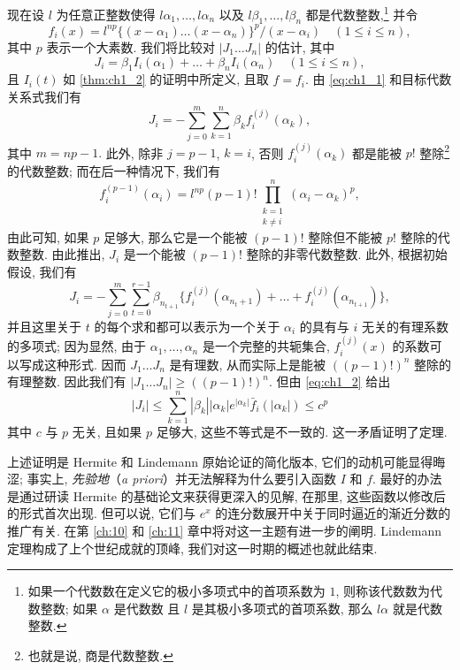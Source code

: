 现在设 $l$ 为任意正整数使得 $l\alpha_1, \dots, l\alpha_n$ 以及 $l\beta_1, \dots, l\beta_n$ 都是代数整数,\footnote{如果一个代数数在定义它的极小多项式中的首项系数为 $1$, 则称该代数数为代数整数; 如果 $\alpha$ 是代数数 且 $l$ 是其极小多项式的首项系数, 那么 $l\alpha$ 就是代数整数.} 并令
\[
f_i(x) = l^{np} \{(x-\alpha_1)\dots(x-\alpha_n)\}^p/(x-\alpha_i) \quad (1 \le i \le n),
\]
其中 $p$ 表示一个大素数. 我们将比较对 $|J_1 \dots J_n|$ 的估计, 其中
\[
J_{i} = \beta_{1} I_{i}(\alpha_{1}) + \dots + \beta_{n} I_{i}(\alpha_{n}) \quad (1 \le i \le n),
\]
且 $I_i(t)$ 如 \autoref{thm:ch1_2} 的证明中所定义, 且取 $f = f_i$. 由 \eqref{eq:ch1_1} 和目标代数关系式我们有
\[
J_i = -\sum_{j=0}^m \sum_{k=1}^n \beta_k f_i^{(j)}(\alpha_k),
\]
其中 $m = np - 1. $ 此外, 除非 $j = p - 1$, $k = i$, 否则 $f_i^{(j)}(\alpha_k)$ 都是能被 $p!$ 整除\footnote{也就是说, 商是代数整数.}的代数整数; 而在后一种情况下, 我们有
\[
f_i^{(p-1)}(\alpha_i) = l^{np}(p-1)! \prod_{\substack{k=1 \\ k \neq i}}^n (\alpha_i - \alpha_k)^p,
\]
由此可知, 如果 $p$ 足够大, 那么它是一个能被 $(p-1)!$ 整除但不能被 $p!$ 整除的代数整数. 由此推出, $J_i$ 是一个能被 $(p-1)!$ 整除的非零代数整数. 此外, 根据初始假设, 我们有
\[
J_{i} = -\sum_{j=0}^{m} \sum_{t=0}^{r-1} \beta_{n_{t+1}} \{ f_{i}^{(j)}(\alpha_{n_t+1}) + \dots + f_{i}^{(j)}(\alpha_{n_{t+1}}) \},
\]
并且这里关于 $t$ 的每个求和都可以表示为一个关于 $\alpha_i$ 的具有与 $i$ 无关的有理系数的多项式; 因为显然, 由于 $\alpha_1, \dots, \alpha_n$ 是一个完整的共轭集合, $f_i^{(j)}(x)$ 的系数可以写成这种形式. 因而 $J_1 \dots J_n$ 是有理数, 从而实际上是能被 $((p-1)!)^n$ 整除的有理整数. 因此我们有 $|J_1 \dots J_n| \ge ((p-1)!)^n$. 但由 \eqref{eq:ch1_2} 给出
\[
|J_i| \le \sum_{k=1}^n |\beta_k| |\alpha_k| e^{|\alpha_k|} \bar{f}_i(|\alpha_k|) \le c^p
\]
其中 $c$ 与 $p$ 无关, 且如果 $p$ 足够大, 这些不等式是不一致的. 这一矛盾证明了定理.

上述证明是 Hermite 和 Lindemann 原始论证的简化版本, 它们的动机可能显得晦涩; 事实上, \textit{先验地}（\textit{a priori}）并无法解释为什么要引入函数 $I$ 和 $f$. 最好的办法是通过研读 Hermite 的基础论文来获得更深入的见解, 在那里, 这些函数以修改后的形式首次出现. 但可以说, 它们与 $e^x$ 的连分数展开中关于同时逼近的渐近分数的推广有关. 在第 \ref{ch:10} 和 \ref{ch:11} 章中将对这一主题有进一步的阐明. Lindemann 定理构成了上个世纪成就的顶峰, 我们对这一时期的概述也就此结束.
